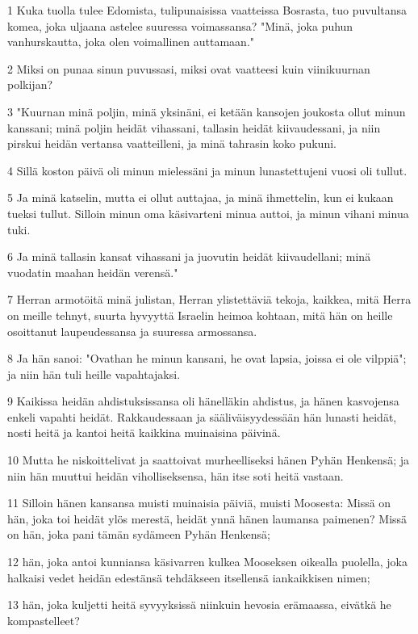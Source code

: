 \par 1 Kuka tuolla tulee Edomista, tulipunaisissa vaatteissa Bosrasta, tuo puvultansa komea, joka uljaana astelee suuressa voimassansa? "Minä, joka puhun vanhurskautta, joka olen voimallinen auttamaan."
\par 2 Miksi on punaa sinun puvussasi, miksi ovat vaatteesi kuin viinikuurnan polkijan?
\par 3 "Kuurnan minä poljin, minä yksinäni, ei ketään kansojen joukosta ollut minun kanssani; minä poljin heidät vihassani, tallasin heidät kiivaudessani, ja niin pirskui heidän vertansa vaatteilleni, ja minä tahrasin koko pukuni.
\par 4 Sillä koston päivä oli minun mielessäni ja minun lunastettujeni vuosi oli tullut.
\par 5 Ja minä katselin, mutta ei ollut auttajaa, ja minä ihmettelin, kun ei kukaan tueksi tullut. Silloin minun oma käsivarteni minua auttoi, ja minun vihani minua tuki.
\par 6 Ja minä tallasin kansat vihassani ja juovutin heidät kiivaudellani; minä vuodatin maahan heidän verensä."
\par 7 Herran armotöitä minä julistan, Herran ylistettäviä tekoja, kaikkea, mitä Herra on meille tehnyt, suurta hyvyyttä Israelin heimoa kohtaan, mitä hän on heille osoittanut laupeudessansa ja suuressa armossansa.
\par 8 Ja hän sanoi: "Ovathan he minun kansani, he ovat lapsia, joissa ei ole vilppiä"; ja niin hän tuli heille vapahtajaksi.
\par 9 Kaikissa heidän ahdistuksissansa oli hänelläkin ahdistus, ja hänen kasvojensa enkeli vapahti heidät. Rakkaudessaan ja sääliväisyydessään hän lunasti heidät, nosti heitä ja kantoi heitä kaikkina muinaisina päivinä.
\par 10 Mutta he niskoittelivat ja saattoivat murheelliseksi hänen Pyhän Henkensä; ja niin hän muuttui heidän viholliseksensa, hän itse soti heitä vastaan.
\par 11 Silloin hänen kansansa muisti muinaisia päiviä, muisti Moosesta: Missä on hän, joka toi heidät ylös merestä, heidät ynnä hänen laumansa paimenen? Missä on hän, joka pani tämän sydämeen Pyhän Henkensä;
\par 12 hän, joka antoi kunniansa käsivarren kulkea Mooseksen oikealla puolella, joka halkaisi vedet heidän edestänsä tehdäkseen itsellensä iankaikkisen nimen;
\par 13 hän, joka kuljetti heitä syvyyksissä niinkuin hevosia erämaassa, eivätkä he kompastelleet?
